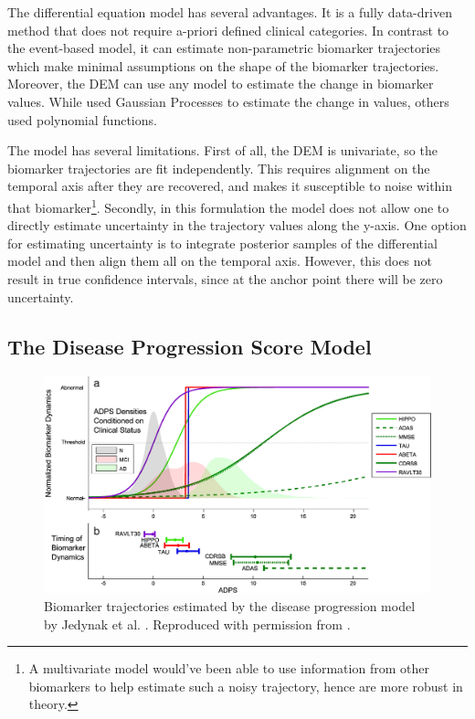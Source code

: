 The differential equation model has several advantages. It is a fully data-driven method that does not require a-priori defined clinical categories. In contrast to the event-based model, it can estimate non-parametric biomarker trajectories which make minimal assumptions on the shape of the biomarker trajectories. Moreover, the DEM can use any model to estimate the change in biomarker values. While \cite{oxtoby2018} used Gaussian Processes to estimate the change in values, others \cite{villemagne2013amyloid} used polynomial functions.

The model has several limitations. First of all, the DEM is univariate, so the biomarker trajectories are fit independently. This requires alignment on the temporal axis after they are recovered, and makes it susceptible to noise within that biomarker\footnote{A multivariate model would've been able to use information from other biomarkers to help estimate such a noisy trajectory, hence are more robust in theory.}. Secondly, in this formulation the model does not allow one to directly estimate uncertainty in the trajectory values along the y-axis. One option for estimating uncertainty is to integrate posterior samples of the differential model and then align them all on the temporal axis. However, this does not result in true confidence intervals, since at the anchor point there will be zero uncertainty.


\subsection{The Disease Progression Score Model}
\label{sec:bckDps}

\begin{figure}
\centering
\includegraphics[width=\textwidth]{images/jedynakDiag}
\caption[ADNI biomarker trajectories estimated by Jedynak et al. \cite{jedynak2012computational}]{Biomarker trajectories estimated by the disease progression model by Jedynak et al. \cite{jedynak2012computational}. Reproduced with permission from \cite{jedynak2012computational}.}
\label{fig:bckDps}
\end{figure}

